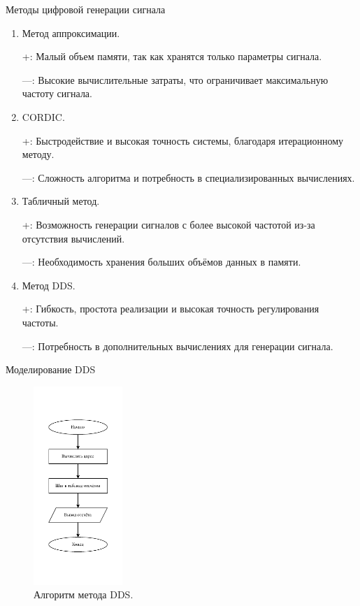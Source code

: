 \documentclass[10pt]{beamer}
\begin{document}
\begin{frame}{Методы цифровой генерации сигнала}
  \begin{enumerate}
		\item Метод аппроксимации. 
		
		+: Малый объем памяти, так как хранятся только параметры сигнала. 
		
		---: Высокие вычислительные затраты, что ограничивает максимальную частоту сигнала.
		
		\item CORDIC.
		
		+: Быстродействие и высокая точность системы, благодаря итерационному методу.
		
		---: Сложность алгоритма и потребность в специализированных вычислениях.
		
		\item Табличный метод.
		
		+: Возможность генерации сигналов с более высокой частотой из-за отсутствия вычислений.
		
		---: Необходимость хранения больших объёмов данных в памяти.
		
		\item Метод DDS.
		
		+: Гибкость, простота реализации и высокая точность регулирования частоты.
		
		---: Потребность в дополнительных вычислениях для генерации сигнала.
  \end{enumerate}
\end{frame}

\begin{frame}{Моделирование DDS}
  \begin{figure}
  \includegraphics[width=0.3\textwidth]{dds_block}
  \caption{Алгоритм метода DDS.}
  \end{figure}
\end{frame}
\end{document}
